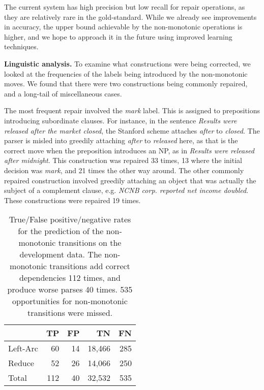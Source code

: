 \documentclass[11pt,letterpaper]{article}
\begin{document}
The current system has high precision but low recall for repair operations,
as they are relatively rare in the gold-standard. While we already see improvements
in accuracy, the upper bound achievable by the non-monotonic operations is higher, and we hope to approach it in the future using improved learning techniques.

\noindent \textbf{Linguistic analysis.}
To examine what constructions were being corrected, we looked at the frequencies
of the labels being introduced by the non-monotonic moves. We found that there were
two constructions being commonly repaired, and a long-tail of miscellaneous cases.

The most frequent repair involved the \emph{mark} label. This is assigned to
prepositions introducing subordinate clauses. For instance, in the sentence
\emph{Results were released after the market closed}, the Stanford scheme
attaches \emph{after} to \emph{closed}. The parser is misled into greedily
attaching \emph{after} to \emph{released} here, as that is the correct move 
when the preposition introduces an NP, as in
\emph{Results were released after midnight}.
This construction was repaired 33 times, 13 where the initial decision was \emph{mark},
and 21 times the other way around. The other commonly repaired construction involved
greedily attaching an object that was actually the subject of a complement clause, e.g.
\emph{NCNB corp. reported net income doubled}. These constructions were repaired 19 times.


\begin{table}
    \centering
    \small
    \begin{tabular}{l|rrrr}
\hline
         & TP  &  FP & TN     & FN \\
\hline \hline
Left-Arc & 60  & 14  & 18,466 & 285 \\
Reduce   & 52  & 26  & 14,066 & 250  \\
Total    & 112 & 40  & 32,532  & 535 \\
\hline
\end{tabular}
\caption{\small
    True/False positive/negative rates for the prediction of the non-monotonic
    transitions on the development data. The non-monotonic transitions add
    correct dependencies 112 times, and produce worse parses 40 times.
    535 opportunities for non-monotonic transitions were missed.
\label{tab:confusions}}
\vspace{-0.5\baselineskip}
\end{table}

\end{document}
